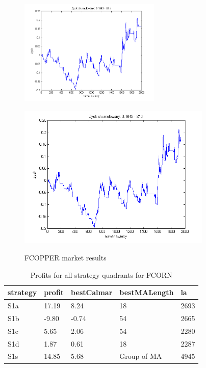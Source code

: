 \documentclass{tewiart}
\begin{document}
\begin{figure}[h]
\begin{minipage}{\linewidth}
\centering
\includegraphics[width=0.6\textwidth]{images/fcopperS1d.png}
\label{mansard}
\end{minipage}
\begin{minipage}{.49\linewidth}
\centering
\includegraphics[width=0.82\textwidth]{images/fcopperS1s.png}
\label{mansard}
\end{minipage}
\caption{FCOPPER market results}
\end{figure}
\newpage
\begin{table}[!t]
\caption{Profits for all strategy quadrants for FCORN}
 \begin{center}
 \begin{tabular}{|l|l|l|l|l|}
 \hline \textbf{strategy} & \textbf{profit} & \textbf{bestCalmar} & \textbf{bestMALength} & \textbf{la} \\ \hline
S1a & 17.19 & 8.24 & 18 & 2693\\ \hline
S1b & -9.80 & -0.74 & 54 & 2665\\ \hline
S1c & 5.65 & 2.06 & 54 & 2280\\ \hline
S1d & 1.87 & 0.61 & 18 & 2287\\ \hline
S1s & 14.85 & 5.68 & Group of MA & 4945\\
\hline \end{tabular}
 \end{center}
 \end{table}
\end{document}
